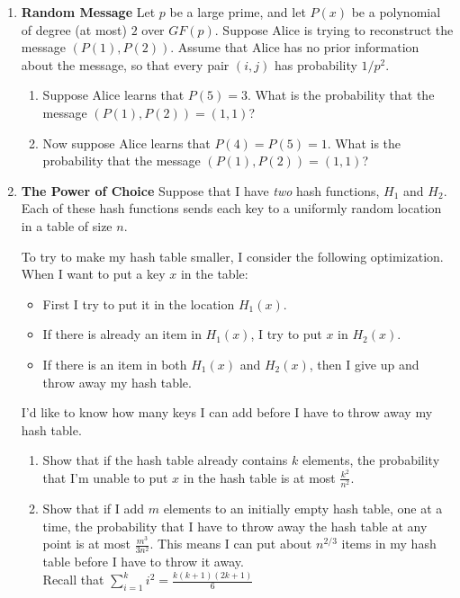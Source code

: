\documentclass[11pt,fleqn]{article}
\begin{document}
\begin{enumerate}
\item \textbf{Random Message}
Let $p$ be a large prime, and let $P(x)$ be a polynomial of degree (at most) $2$ over $GF(p)$. Suppose Alice is trying to reconstruct the message $(P(1), P(2))$. Assume that Alice has no prior information about the message, so that every pair $(i, j)$ has probability $1/p^2$.

\begin{enumerate}
\item Suppose Alice learns that $P(5) = 3$. What is the probability that the message $(P(1), P(2)) = (1,1)$?
\item Now suppose Alice learns that $P(4) = P(5) = 1$. What is the probability that the message $(P(1), P(2)) = (1,1)$?
\end{enumerate}

\item \textbf{The Power of Choice} 
Suppose that I have \emph{two} hash functions,
$H_1$ and $H_2$.
Each of these hash functions sends each key
to a uniformly random location in a table of size $n$.

To try to make my hash table smaller, I consider the following
optimization. When I want to put a key $x$ in the table:
\begin{itemize}
\item First I try to put it in the location $H_1(x)$.
\item If there is already an item in $H_1(x)$,
I try to put $x$ in $H_2(x)$.
\item If there is an item in both $H_1(x)$ and $H_2(x)$,
then I give up and throw away my hash table.
\end{itemize}

I'd like to know how many keys I can add before I have to throw
away my hash table.
\begin{enumerate}
\item Show that if the hash table already contains $k$ elements,
the probability that I'm unable to put $x$
in the hash table is at most $\frac {k^2}{n^2}$.
\item Show that if I add $m$ elements
to an initially empty hash table,
one at a time,
the probability that I have to throw away the hash table
at any point is at most $\frac {m^3}{3 n^2}$.
This means I can put about $n^{2/3}$ items in my hash table before I have to throw it away.\\
Recall that $\sum_{i=1}^k i^2 = \frac{k(k+1)(2k+1)}{6}$
\end{enumerate}


\end{enumerate}
\end{document}
